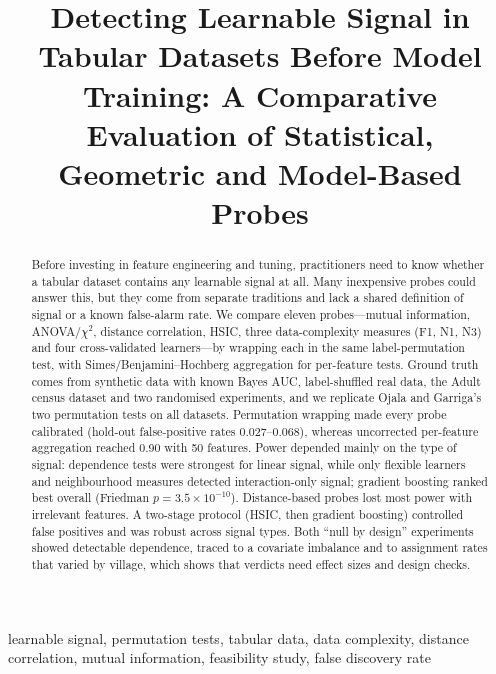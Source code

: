 \documentclass[conference]{IEEEtran}
\begin{document}
\title{Detecting Learnable Signal in Tabular Datasets Before Model Training: A Comparative Evaluation of Statistical, Geometric and Model-Based Probes}

\author{
}

\maketitle

\begin{abstract}
Before investing in feature engineering and tuning, practitioners need to know whether a tabular dataset contains any learnable signal at all. Many inexpensive probes could answer this, but they come from separate traditions and lack a shared definition of signal or a known false-alarm rate. We compare eleven probes---mutual information, ANOVA/$\chi^2$, distance correlation, HSIC, three data-complexity measures (F1, N1, N3) and four cross-validated learners---by wrapping each in the same label-permutation test, with Simes/Benjamini--Hochberg aggregation for per-feature tests. Ground truth comes from synthetic data with known Bayes AUC, label-shuffled real data, the Adult census dataset and two randomised experiments, and we replicate Ojala and Garriga's two permutation tests on all datasets. Permutation wrapping made every probe calibrated (hold-out false-positive rates 0.027--0.068), whereas uncorrected per-feature aggregation reached 0.90 with 50 features. Power depended mainly on the type of signal: dependence tests were strongest for linear signal, while only flexible learners and neighbourhood measures detected interaction-only signal; gradient boosting ranked best overall (Friedman $p=3.5\times10^{-10}$). Distance-based probes lost most power with irrelevant features. A two-stage protocol (HSIC, then gradient boosting) controlled false positives and was robust across signal types. Both ``null by design'' experiments showed detectable dependence, traced to a covariate imbalance and to assignment rates that varied by village, which shows that verdicts need effect sizes and design checks.
\end{abstract}

\begin{IEEEkeywords}
learnable signal, permutation tests, tabular data, data complexity, distance correlation, mutual information, feasibility study, false discovery rate
\end{IEEEkeywords}
\end{document}
